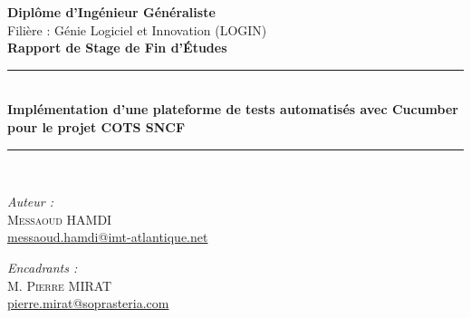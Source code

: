 \begin{titlepage}
\begin{minipage}{0.32\textwidth}
  \end{minipage}
  \vspace{15mm}
  \begin{center}
  {\large \bfseries Diplôme d'Ingénieur Généraliste}\\[0.5cm]
  {\large Filière : Génie Logiciel et Innovation (LOGIN)}\\[0.8cm]
  {\huge \bfseries Rapport de Stage de Fin d'Études}\\
  \end{center}
  \vspace{7mm}
  \rule{\linewidth}{0.3mm} \\[0.4cm]
  { \huge \bfseries Implémentation d'une plateforme de tests automatisés avec Cucumber pour le projet COTS SNCF\\[0.4cm] }
  \rule{\linewidth}{0.3mm} \\[1cm]
  \vspace{5mm}
  \noindent
  \begin{minipage}{0.5\textwidth}
    \begin{flushleft} \large
      \emph{Auteur :}\\
      \vskip 0.05cm
      \textsc{Messaoud HAMDI}\\
      \small{\href{mailto:messaoud.hamdi@imt-atlantique.net}{messaoud.hamdi@imt-atlantique.net}}\\[0.5cm]
    \end{flushleft}
  \end{minipage}
  \begin{minipage}{0.4\textwidth}
    \begin{flushright} \large
      \begin{flushleft}
      \emph{Encadrants :} \\
      \vskip 0.05cm
      M. \textsc{Pierre MIRAT}\\
      \small{\href{mailto:pierre.mirat@soprasteria.com}{pierre.mirat@soprasteria.com}}\\[0.5cm]
      

\end{flushleft}
\end{flushright}
\end{minipage}
\end{titlepage}
